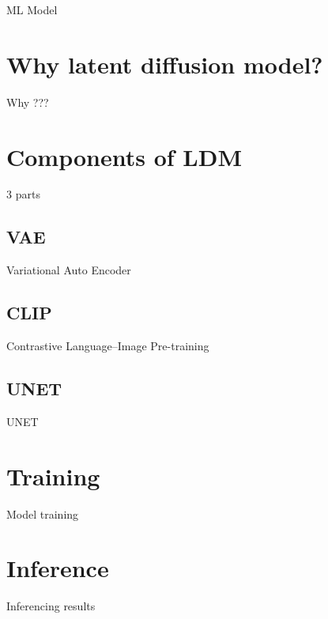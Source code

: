 ML Model

\section{Why latent diffusion model?}

Why ???

\section{Components of LDM}

3 parts

\subsection{VAE}

Variational Auto Encoder

\subsection{CLIP}

Contrastive Language–Image Pre-training

\subsection{UNET}

UNET

\section{Training}

Model training

\section{Inference}

Inferencing results